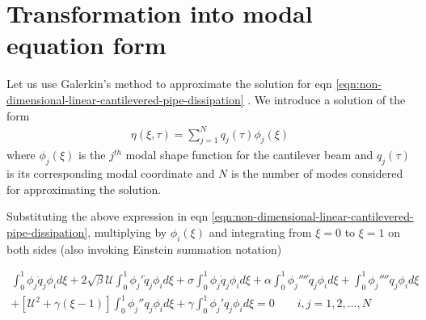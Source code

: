 \documentclass[12pt]{report}
\begin{document}
\section{Transformation into modal equation form}
Let us use Galerkin's method to approximate the solution for eqn \ref{eqn:non-dimensional-linear-cantilevered-pipe-dissipation} \cite{paidoussis1974}. We introduce a solution of the form
\begin{align}
\eta(\xi, \tau) = \sum_{j=1}^N q_j (\tau)\phi_j (\xi)  \label{eqn:modal-decomposition}
\end{align}
where $\phi_j (\xi)$ is the $j^{th}$ modal shape function for the cantilever beam and $q_j (\tau)$ is its corresponding modal coordinate and $N$ is the number of modes considered for approximating the solution.

Substituting the above expression in eqn \ref{eqn:non-dimensional-linear-cantilevered-pipe-dissipation}, multiplying by $\phi_i (\xi)$ and integrating from $\xi = 0$ to $\xi = 1$ on both sides (also invoking Einstein summation notation)

\begin{multline*}
  \int_0^1 \phi_j \ddot{q}_j \phi_i d\xi + 2\sqrt{\beta}\mathcal{U} \int_0^1 \phi_j' \dot{q}_j \phi_i d\xi + \sigma \int_0^1 \phi_j \dot{q}_j \phi_i d\xi  +  \alpha   \int_0^1 \phi_j'''' \dot{q}_j \phi_i d\xi +  \int_0^1 \phi_j'''' q_j \phi_i d\xi \\
   +  \left[\mathcal{U}^2 + \gamma (\xi - 1)\right]\int_0^1 \phi_j'' q_j \phi_i d\xi  + \gamma \int_0^1 \phi_j' q_j \phi_i d\xi  = 0 \qquad i,j = 1,2, \dots, N
\end{multline*}
\end{document}
